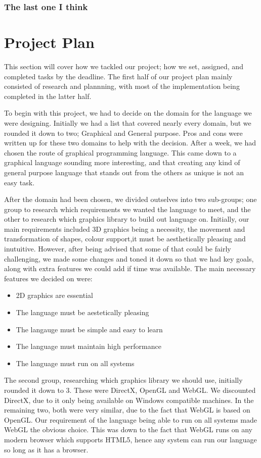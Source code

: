 \documentclass{l3proj}
\begin{document}
\subsection{The last one I think}

\chapter{Project Plan}
\label{plan}
This section will cover how we tackled our project; how we set, assigned, and completed tasks by the deadline. The first half of our project plan mainly consisted of research and plannning, with most of the implementation being completed in the latter half.

To begin with this project, we had to decide on the domain for the language we were designing. Initially we had a list that covered nearly every domain, but we rounded it down to two; Graphical and General purpose. Pros and cons were written up for these two domains to help with the decision. After a week, we had chosen the route of graphical programming language. This came down to a graphical language sounding more interesting, and that creating any kind of general purpose language that stands out from the others as unique is not an easy task.

After the domain had been chosen, we divided outselves into two sub-groups; one group to research which requirements we wanted the language to meet, and the other to research which graphics library to build out language on. Initially, our main requirements included 3D graphics being a necessity, the movement and transformation of shapes, colour support,it must be aesthetically pleasing and inutuitive. However, after being advised that some of that could be fairly challenging, we made some changes and toned it down so that we had key goals, along with extra features we could add if time was available. The main necessary features we decided on were:
\begin{itemize}
\item 2D graphics are essential
\item The language must be aestetically pleasing
\item The langauge must be simple and easy to learn
\item The language must maintain high performance
\item The language must run on all systems
\end{itemize}
The second group, researching which graphics library we should use, initially rounded it down to 3. These were DirectX, OpenGL and WebGL. We discounted DirectX, due to it only being available on Windows compatible machines. In the remaining two, both were very similar, due to the fact that WebGL is based on OpenGL. Our requirement of the language being able to run on all systems made WebGL the obvious choice. This was down to the fact that WebGL runs on any modern browser which supports HTML5, hence any system can run our language so long as it has a browser.
\end{document}
